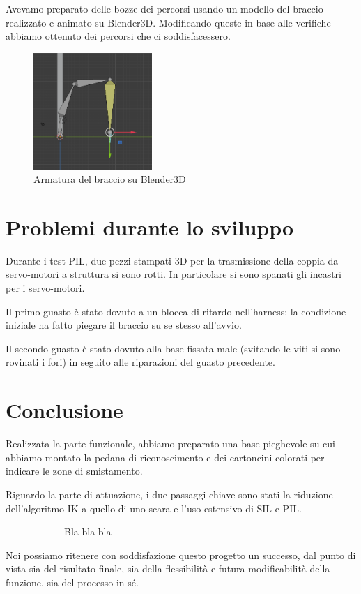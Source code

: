 \documentclass[12pt]{report}
\begin{document}
Avevamo preparato delle bozze dei percorsi usando un modello del braccio realizzato e animato su Blender3D. Modificando queste in base alle verifiche abbiamo ottenuto dei percorsi che ci soddisfacessero.

\begin{figure}
\centering
\includegraphics[width=0.4\textwidth]{Blender3D}
\caption{Armatura del braccio su Blender3D}
\end{figure}

\chapter{Problemi durante lo sviluppo}

Durante i test PIL, due pezzi stampati 3D per la trasmissione della coppia da servo-motori a struttura si sono rotti. In particolare si sono spanati gli incastri per i servo-motori.

Il primo guasto è stato dovuto a un blocca di ritardo nell'harness: la condizione iniziale ha fatto piegare il braccio su se stesso all'avvio.

Il secondo guasto è stato dovuto alla base fissata male (svitando le viti si sono rovinati i fori) in seguito alle riparazioni del guasto precedente.

\chapter{Conclusione}

Realizzata la parte funzionale, abbiamo preparato una base pieghevole su cui abbiamo montato la pedana di riconoscimento e dei cartoncini colorati per indicare le zone di smistamento.

Riguardo la parte di attuazione, i due passaggi chiave sono stati la riduzione dell'algoritmo IK a quello di uno scara e l'uso estensivo di SIL e PIL.


------------------Bla bla bla

Noi possiamo ritenere con soddisfazione questo progetto un successo, dal punto di vista sia del risultato finale, sia della flessibilità e futura modificabilità della funzione, sia del processo in sé.
\end{document}
